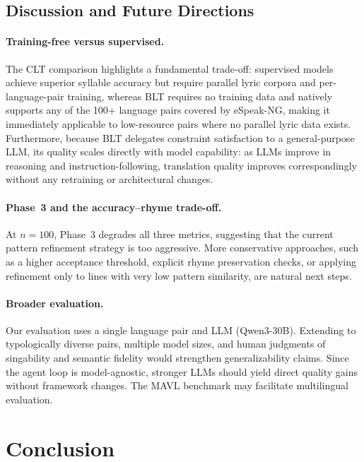 \documentclass[11pt]{article}
\begin{document}
\subsection{Discussion and Future Directions}

\paragraph{Training-free versus supervised.}
The CLT comparison highlights a fundamental trade-off: supervised models achieve superior syllable accuracy but require parallel lyric corpora and per-language-pair training, whereas BLT requires no training data and natively supports any of the 100+ language pairs covered by eSpeak-NG, making it immediately applicable to low-resource pairs where no parallel lyric data exists.
Furthermore, because BLT delegates constraint satisfaction to a general-purpose LLM, its quality scales directly with model capability: as LLMs improve in reasoning and instruction-following, translation quality improves correspondingly without any retraining or architectural changes.

\paragraph{Phase~3 and the accuracy--rhyme trade-off.}
At $n{=}100$, Phase~3 degrades all three metrics, suggesting that the current pattern refinement strategy is too aggressive.
More conservative approaches, such as a higher acceptance threshold, explicit rhyme preservation checks, or applying refinement only to lines with very low pattern similarity, are natural next steps.

\paragraph{Broader evaluation.}
Our evaluation uses a single language pair and LLM (Qwen3-30B).
Extending to typologically diverse pairs, multiple model sizes, and human judgments of singability and semantic fidelity would strengthen generalizability claims.
Since the agent loop is model-agnostic, stronger LLMs should yield direct quality gains without framework changes.
The MAVL benchmark \citep{cho-etal-2025-mavl} may facilitate multilingual evaluation.

\section{Conclusion}
\end{document}
